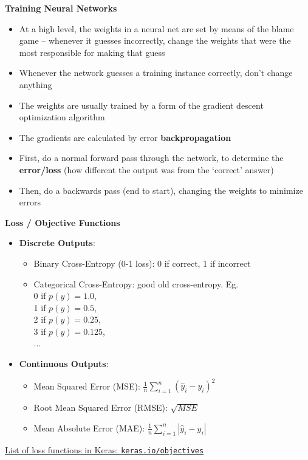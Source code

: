 \documentclass{beamer}
\newcommand{\pagestepalt}[2]{
  \begin{frame}[t]
    \begin{minipage}[t][0.26\textheight][t]{\textwidth}
      \begin{center}
        \huge
        \textbf{#1}
      \end{center}
    \end{minipage}
    
    \begin{minipage}[t][0.7\textheight][c]{\textwidth}
      #2
    \end{minipage}
  \end{frame}
}
\begin{document}
\pagestepalt{Training Neural Networks}{
\begin{itemize}
	\item At a high level, the weights in a neural net are set by means of the blame game -- whenever it guesses incorrectly, change the weights that were the most responsible for making that guess
	\pause
	\item Whenever the network guesses a training instance correctly, don't change anything
	\pause
	\item The weights are usually trained by a form of the gradient descent optimization algorithm
	\item The gradients are calculated by error \textbf{backpropagation}
	\item First, do a normal forward pass through the network, to determine the \textbf{error/loss} (how different the output was from the `correct' answer)
	\item Then, do a backwards pass (end to start), changing the weights to minimize errors
\end{itemize}
}

\pagestepalt{Loss / Objective Functions}{
\begin{itemize}
	\item \textbf{Discrete Outputs}:
	\begin{itemize}
		\item Binary Cross-Entropy (0-1 loss): 0 if correct, 1 if incorrect
		\item Categorical Cross-Entropy: good old cross-entropy. Eg.\\ 0 if $p(y)=1.0$, \\ 1 if $p(y) = 0.5$, \\ 2 if $p(y)=0.25$, \\ 3 if $p(y)=0.125$, \\ ...
	\end{itemize}
	\item \textbf{Continuous Outputs}:
	\begin{itemize}
		\item Mean Squared Error (MSE): $\frac{1}{n} \sum_{i=1}^n (\hat{y}_i - y_i)^2$
		\item Root Mean Squared Error (RMSE): $\sqrt{MSE}$
		\item Mean Absolute Error (MAE): $\frac{1}{n} \sum_{i=1}^n |\hat{y}_i - y_i|$
	\end{itemize}
\end{itemize}
\pause
\vspace*{1.0em}
\href{http://keras.io/objectives}{List of loss functions in Keras: \texttt{keras.io/objectives}}
}
\end{document}
